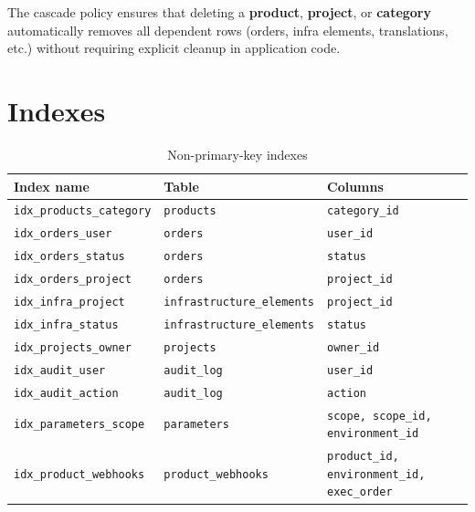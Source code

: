 \documentclass[12pt,a4paper,twoside]{report}
\newcommand{\notebox}[1]{\begin{tcolorbox}[noteboxstyle]#1\end{tcolorbox}}
\newcommand{\code}[1]{\texttt{#1}}
\begin{document}
\notebox{The cascade policy ensures that deleting a \textbf{product},
\textbf{project}, or \textbf{category} automatically removes all
dependent rows (orders, infra elements, translations, etc.) without
requiring explicit cleanup in application code.}

\section{Indexes}
\label{sec:schema-indexes}

\begin{table}[H]
  \centering
  \caption{Non-primary-key indexes}
  \begin{tabular}{@{}lll@{}}
    \toprule
    \textbf{Index name} & \textbf{Table} & \textbf{Columns} \\
    \midrule
    \code{idx\_products\_category}   & \code{products}               & \code{category\_id} \\
    \code{idx\_orders\_user}         & \code{orders}                 & \code{user\_id} \\
    \code{idx\_orders\_status}       & \code{orders}                 & \code{status} \\
    \code{idx\_orders\_project}      & \code{orders}                 & \code{project\_id} \\
    \code{idx\_infra\_project}       & \code{infrastructure\_elements} & \code{project\_id} \\
    \code{idx\_infra\_status}        & \code{infrastructure\_elements} & \code{status} \\
    \code{idx\_projects\_owner}      & \code{projects}               & \code{owner\_id} \\
    \code{idx\_audit\_user}          & \code{audit\_log}             & \code{user\_id} \\
    \code{idx\_audit\_action}        & \code{audit\_log}             & \code{action} \\
    \code{idx\_parameters\_scope}    & \code{parameters}             & \code{scope, scope\_id, environment\_id} \\
    \code{idx\_product\_webhooks}    & \code{product\_webhooks}      & \code{product\_id, environment\_id, exec\_order} \\
    \bottomrule
  \end{tabular}
\end{table}

\end{document}

